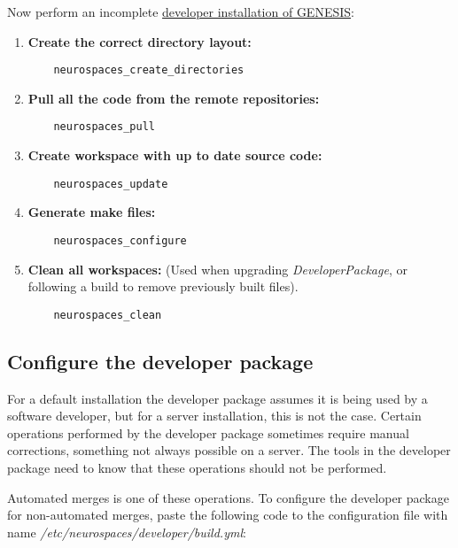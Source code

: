 \documentclass[12pt]{article}
\begin{document}
Now perform an incomplete
\href{../installation-developer/installation-developer.tex}{developer
  installation of GENESIS}:

\begin{enumerate}
\item {\bf Create the correct directory layout:}
\begin{verbatim}
	neurospaces_create_directories
\end{verbatim}
  
\item {\bf Pull all the code from the remote repositories:}
\begin{verbatim}
	neurospaces_pull
\end{verbatim}

\item {\bf Create workspace with up to date source code:}
\begin{verbatim}
	neurospaces_update
\end{verbatim}

\item {\bf Generate make files:}
\begin{verbatim}
	neurospaces_configure
\end{verbatim}

\item {\bf Clean all workspaces:} (Used when upgrading {\it DeveloperPackage}, or following a build to remove previously built files).
\begin{verbatim}
	neurospaces_clean
\end{verbatim}

\end{enumerate}


\subsection*{Configure the developer package}

For a default installation the developer package assumes it is being
used by a software developer, but for a server installation, this is
not the case.  Certain operations performed by the developer package
sometimes require manual corrections, something not always possible on
a server.  The tools in the developer package need to know that these
operations should not be performed.

Automated merges is one of these operations.  To configure the
developer package for non-automated merges, paste the following code
to the configuration file with name {\it
  /etc/neurospaces/developer/build.yml}:
\end{document}
